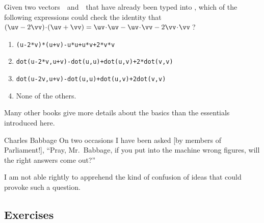 \begin{activity}
Given two vectors~\uv\ and~\vv\ that have already been typed into \script,
which of the following expressions could check the identity that \((\uv-2\vv)\cdot(\uv+\vv)=\uv\cdot\uv-\uv\cdot\vv-2\vv\cdot\vv\)\,?
\begin{enumerate}
\item \verb|(u-2*v)*(u+v)-u*u+u*v+2*v*v|
\item \verb|dot(u-2*v,u+v)-dot(u,u)+dot(u,v)+2*dot(v,v)|
\item \verb|dot(u-2v,u+v)-dot(u,u)+dot(u,v)+2dot(v,v)|
\item None of the others.
\end{enumerate}
\end{activity}




Many other books \cite[\S\S1.1--3, e.g.]{Quarteroni2006} give more details about the basics than the essentials introduced here.




\begin{quoted}{Charles Babbage}%
On two occasions I have been asked [by members of 
Parliament!], ``Pray, Mr.~Babbage, if you put into the machine wrong figures, will the right answers come out?''

I am not able rightly to apprehend the kind of confusion of ideas that could provoke such a question.
\end{quoted}




\subsection{Exercises}


